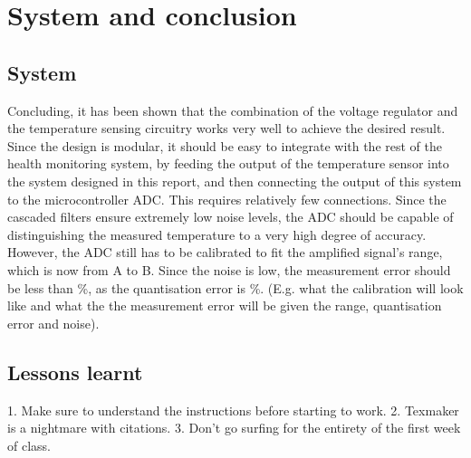 \chapter{System and conclusion}
\vspace{-5mm}
\section{System}
Concluding, it has been shown that the combination of the voltage regulator and the temperature sensing circuitry works very well to achieve the desired result. Since the design is modular, it should be easy to integrate with the rest of the health monitoring system, by feeding the output of the temperature sensor into the system designed in this report, and then connecting the output of this system to the microcontroller ADC. This requires relatively few connections. Since the cascaded filters ensure extremely low noise levels, the ADC should be capable of distinguishing the measured temperature to a very high degree of accuracy. However, the ADC still has to be calibrated to fit the amplified signal's range, which is now from A to B. Since the noise is low, the measurement error should be less than \%, as the quantisation error is \%.
(E.g. what the calibration will look like and what the the measurement error will be given the range, quantisation error and noise). 

\section{Lessons learnt}
1. Make sure to understand the instructions before starting to work.
2. Texmaker is a nightmare with citations.
3. Don't go surfing for the entirety of the first week of class.
